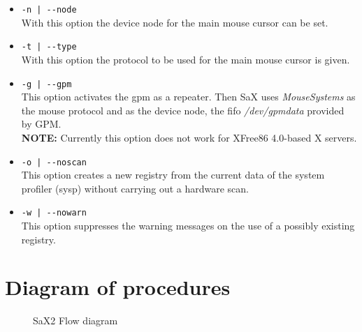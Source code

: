 \begin{itemize}
\item \verb+-n | --node+\\  
      With this option the device node for the main mouse cursor can be set.

\item \verb+-t | --type+\\
      With this  option the protocol to be used for the main mouse cursor
      is given. 

\item \verb+-g | --gpm+\\
      This option activates the gpm as a repeater. Then SaX uses 
      \textit{MouseSystems} as the mouse protocol and as the device node, the
      fifo \textit{/dev/gpmdata} provided by GPM.\\
      \textbf{NOTE:} Currently this option does not work for XFree86 4.0-based
      X servers.

\item \verb+-o | --noscan+\\
      This option creates a new registry from the current data of the system 
      profiler (sysp) without carrying out a hardware scan.

\item \verb+-w | --nowarn+\\
      This option suppresses the warning messages on the use of a possibly
      existing registry.
\end{itemize}


\newpage 
\section{Diagram of procedures}

\begin{figure}[h]
\centering
{}
\caption{SaX2 Flow diagram}
\end{figure}







